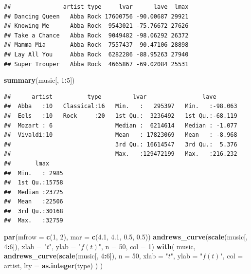 \documentclass[
  b5paper,
  UTF8,twoside]{book}
\newenvironment{Shaded}{\begin{snugshade}}{\end{snugshade}}
\newcommand{\AttributeTok}[1]{\textcolor[rgb]{0.13,0.29,0.53}{#1}}
\newcommand{\DecValTok}[1]{\textcolor[rgb]{0.00,0.00,0.81}{#1}}
\newcommand{\FloatTok}[1]{\textcolor[rgb]{0.00,0.00,0.81}{#1}}
\newcommand{\FunctionTok}[1]{\textcolor[rgb]{0.13,0.29,0.53}{\textbf{#1}}}
\newcommand{\NormalTok}[1]{#1}
\newcommand{\SpecialCharTok}[1]{\textcolor[rgb]{0.81,0.36,0.00}{\textbf{#1}}}
\newcommand{\StringTok}[1]{\textcolor[rgb]{0.31,0.60,0.02}{#1}}
\begin{document}
\begin{verbatim}
##               artist type     lvar      lave  lmax
## Dancing Queen   Abba Rock 17600756 -90.00687 29921
## Knowing Me      Abba Rock  9543021 -75.76672 27626
## Take a Chance   Abba Rock  9049482 -98.06292 26372
## Mamma Mia       Abba Rock  7557437 -90.47106 28898
## Lay All You     Abba Rock  6282286 -88.95263 27940
## Super Trouper   Abba Rock  4665867 -69.02084 25531
\end{verbatim}

\begin{Shaded}
\begin{Highlighting}[]
\FunctionTok{summary}\NormalTok{(music[, }\DecValTok{1}\SpecialCharTok{:}\DecValTok{5}\NormalTok{])}
\end{Highlighting}
\end{Shaded}

\begin{verbatim}
##      artist          type         lvar                lave        
##  Abba   :10   Classical:16   Min.   :   295397   Min.   :-98.063  
##  Eels   :10   Rock     :20   1st Qu.:  3236492   1st Qu.:-68.119  
##  Mozart : 6                  Median :  6214614   Median : -1.077  
##  Vivaldi:10                  Mean   : 17823069   Mean   : -8.968  
##                              3rd Qu.: 16614547   3rd Qu.:  5.376  
##                              Max.   :129472199   Max.   :216.232  
##       lmax      
##  Min.   : 2985  
##  1st Qu.:15758  
##  Median :23725  
##  Mean   :22506  
##  3rd Qu.:30168  
##  Max.   :32759
\end{verbatim}

\begin{Shaded}
\begin{Highlighting}[]
\FunctionTok{par}\NormalTok{(}\AttributeTok{mfrow =} \FunctionTok{c}\NormalTok{(}\DecValTok{1}\NormalTok{, }\DecValTok{2}\NormalTok{), }\AttributeTok{mar =} \FunctionTok{c}\NormalTok{(}\FloatTok{4.1}\NormalTok{, }\FloatTok{4.1}\NormalTok{, }\FloatTok{0.5}\NormalTok{, }\FloatTok{0.5}\NormalTok{))}
\FunctionTok{andrews\_curve}\NormalTok{(}\FunctionTok{scale}\NormalTok{(music[, }\DecValTok{4}\SpecialCharTok{:}\DecValTok{6}\NormalTok{]), }\AttributeTok{xlab =} \StringTok{"$t$"}\NormalTok{, }\AttributeTok{ylab =} \StringTok{"$f(t)$"}\NormalTok{,}
              \AttributeTok{n =} \DecValTok{50}\NormalTok{, }\AttributeTok{col =} \DecValTok{1}\NormalTok{)}
\FunctionTok{with}\NormalTok{(}
\NormalTok{  music,}
  \FunctionTok{andrews\_curve}\NormalTok{(}\FunctionTok{scale}\NormalTok{(music[, }\DecValTok{4}\SpecialCharTok{:}\DecValTok{6}\NormalTok{]),}
    \AttributeTok{n =} \DecValTok{50}\NormalTok{, }\AttributeTok{xlab =} \StringTok{"$t$"}\NormalTok{, }\AttributeTok{ylab =} \StringTok{"$f(t)$"}\NormalTok{,}
    \AttributeTok{col =}\NormalTok{ artist, }\AttributeTok{lty =} \FunctionTok{as.integer}\NormalTok{(type)}
\NormalTok{  )}
\NormalTok{)}
\end{Highlighting}
\end{Shaded}
\end{document}
